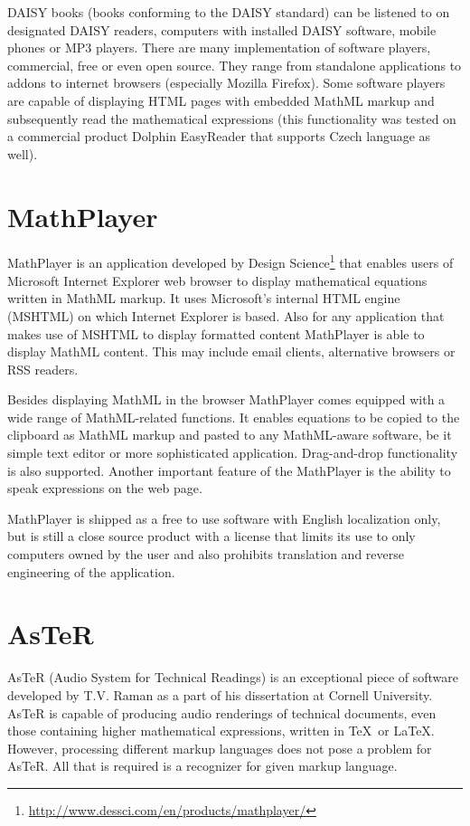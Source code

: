 \documentclass[11pt,oneside,final]{fithesis2}
\begin{document}
DAISY books (books conforming to the DAISY standard) can be listened to on designated DAISY readers, computers with installed DAISY software, mobile phones or MP3 players. There are many implementation of software players, commercial, free or even open source. They range from standalone applications to addons to internet browsers (especially Mozilla Firefox). Some software players are capable of displaying HTML pages with embedded MathML markup and subsequently read the mathematical expressions (this functionality was tested on a commercial product Dolphin EasyReader that supports Czech language as well).   

\section{MathPlayer}
\label{mathml:mathplayer}
MathPlayer is an application developed by Design Science\footnote{\url{http://www.dessci.com/en/products/mathplayer/}} that enables users of Microsoft Internet Explorer web browser to display mathematical equations written in MathML markup. It uses Microsoft's internal HTML engine (MSHTML) on which Internet Explorer is based. Also for any application that makes use of MSHTML to display formatted content MathPlayer is able to display MathML content. This may include email clients, alternative browsers or RSS readers. 

Besides displaying MathML in the browser MathPlayer comes equipped with a wide range of MathML-related functions. It enables equations to be copied to the clipboard as MathML markup and pasted to any MathML-aware software, be it simple text editor or more sophisticated application. Drag-and-drop functionality is also supported. Another important feature of the MathPlayer is the ability to speak expressions on the web page.

MathPlayer is shipped as a free to use software with English localization only, but is still a close source product with a license that limits its use to only computers owned by the user and also prohibits translation and reverse engineering of the application.

\section{AsTeR}
AsTeR (Audio System for Technical Readings) \cite{aster1994} is an exceptional piece of software developed by T.V. Raman as a part of his dissertation at Cornell University. AsTeR is capable of producing audio renderings of technical documents, even those containing higher mathematical expressions, written in \TeX\ or \LaTeX. However, processing different markup languages does not pose a problem for AsTeR. All that is required is a recognizer for given markup language. 
\end{document}
